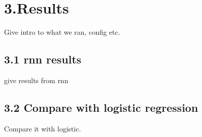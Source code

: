 
\section*{3.Results}

Give intro to what we ran, config etc.

\subsection*{3.1 rnn results}

give results from rnn

\subsection*{3.2 Compare with logistic regression}

Compare it with logistic.

